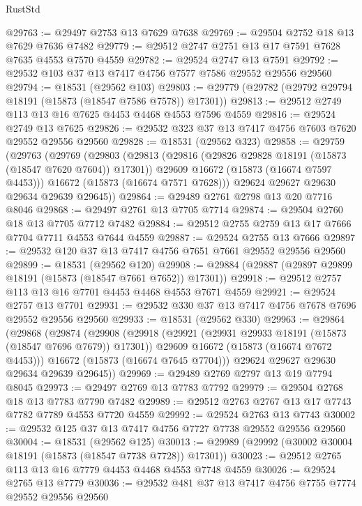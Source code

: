 \begin{lexlean}{RustStd}
\begin{coremodule}
@29763 := @29497 @2753 @13 @7629 @7638
@29769 := @29504 @2752 @18 @13 @7629 @7636 @7482
@29779 := @29512 @2747 @2751 @13 @17 @7591 @7628 @7635 @4553 @7570 @4559
@29782 := @29524 @2747 @13 @7591
@29792 := @29532 @103 @37 @13 @7417 @4756 @7577 @7586 @29552 @29556 @29560
@29794 := @18531 (@29562 @103)
@29803 := @29779 (@29782 (@29792 @29794 @18191 (@15873 (@18547 @7586 @7578)) @17301))
@29813 := @29512 @2749 @113 @13 @16 @7625 @4453 @4468 @4553 @7596 @4559
@29816 := @29524 @2749 @13 @7625
@29826 := @29532 @323 @37 @13 @7417 @4756 @7603 @7620 @29552 @29556 @29560
@29828 := @18531 (@29562 @323)
@29858 := @29759
    (@29763
      (@29769
        (@29803
          (@29813
            (@29816 (@29826 @29828 @18191 (@15873 (@18547 @7620 @7604)) @17301))
            @29609
            @16672
            (@15873 (@16674 @7597 @4453)))
          @16672
          (@15873 (@16674 @7571 @7628)))
        @29624
        @29627
        @29630
        @29634
        @29639
        @29645))
@29864 := @29489 @2761 @2798 @13 @20 @7716 @8046
@29868 := @29497 @2761 @13 @7705 @7714
@29874 := @29504 @2760 @18 @13 @7705 @7712 @7482
@29884 := @29512 @2755 @2759 @13 @17 @7666 @7704 @7711 @4553 @7644 @4559
@29887 := @29524 @2755 @13 @7666
@29897 := @29532 @120 @37 @13 @7417 @4756 @7651 @7661 @29552 @29556 @29560
@29899 := @18531 (@29562 @120)
@29908 := @29884 (@29887 (@29897 @29899 @18191 (@15873 (@18547 @7661 @7652)) @17301))
@29918 := @29512 @2757 @113 @13 @16 @7701 @4453 @4468 @4553 @7671 @4559
@29921 := @29524 @2757 @13 @7701
@29931 := @29532 @330 @37 @13 @7417 @4756 @7678 @7696 @29552 @29556 @29560
@29933 := @18531 (@29562 @330)
@29963 := @29864
    (@29868
      (@29874
        (@29908
          (@29918
            (@29921 (@29931 @29933 @18191 (@15873 (@18547 @7696 @7679)) @17301))
            @29609
            @16672
            (@15873 (@16674 @7672 @4453)))
          @16672
          (@15873 (@16674 @7645 @7704)))
        @29624
        @29627
        @29630
        @29634
        @29639
        @29645))
@29969 := @29489 @2769 @2797 @13 @19 @7794 @8045
@29973 := @29497 @2769 @13 @7783 @7792
@29979 := @29504 @2768 @18 @13 @7783 @7790 @7482
@29989 := @29512 @2763 @2767 @13 @17 @7743 @7782 @7789 @4553 @7720 @4559
@29992 := @29524 @2763 @13 @7743
@30002 := @29532 @125 @37 @13 @7417 @4756 @7727 @7738 @29552 @29556 @29560
@30004 := @18531 (@29562 @125)
@30013 := @29989 (@29992 (@30002 @30004 @18191 (@15873 (@18547 @7738 @7728)) @17301))
@30023 := @29512 @2765 @113 @13 @16 @7779 @4453 @4468 @4553 @7748 @4559
@30026 := @29524 @2765 @13 @7779
@30036 := @29532 @481 @37 @13 @7417 @4756 @7755 @7774 @29552 @29556 @29560

\end{coremodule}
\end{lexlean}
